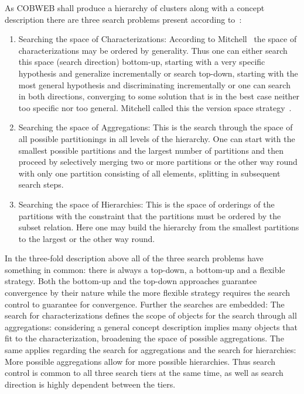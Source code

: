 As COBWEB shall produce a hierarchy of clusters along with a concept description there are three search problems present according to~\cite{fisher1985approaches}:
\begin{enumerate}
    \item Searching the space of Characterizations: According to Mitchell~\cite{mitchell1982generalization} the space of characterizations may be ordered by generality. Thus one can either search this space (search direction) bottom-up, starting with a very specific hypothesis and generalize incrementally or search top-down, starting with the most general hypothesis and discriminating incrementally or one can search in both directions, converging to some solution that is in the best case neither too specific nor too general. Mitchell called this the version space strategy~\cite{mitchell1982generalization}.
    \item Searching the space of Aggregations: This is the search through the space of all possible partitionings in all levels of the hierarchy. One can start with the smallest possible partitions and the largest number of partitions and then proceed by selectively merging two or more partitions or the other way round with only one partition consisting of all elements, splitting in subsequent search steps.
    \item Searching the space of Hierarchies: This is the space of orderings of the partitions with the constraint that the partitions must be ordered by the subset relation.  Here one may build the hierarchy from the smallest partitions to the largest or the other way round.
\end{enumerate}
In the three-fold description above all of the three search problems have something in common: there is always a top-down, a bottom-up and a flexible strategy. Both the bottom-up and the top-down approaches guarantee convergence by their nature while the more flexible strategy requires the search control to guarantee for convergence. Further the searches are embedded: The search for characterizations defines the scope of objects for the search through all aggregations: considering a general concept description implies many objects that fit to the characterization, broadening the space of possible aggregations. The same applies regarding the search for aggregations and the search for hierarchies: More possible aggregations allow for more possible hierarchies. Thus search control is common to all three search tiers at the same time, as well as search direction is highly dependent between the tiers. \\

